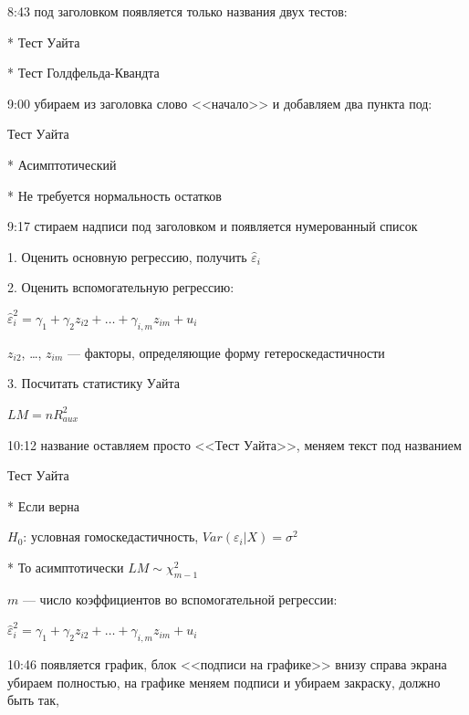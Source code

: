\documentclass[12pt,a4paper]{article}
\newcommand{\e}{\varepsilon}
\begin{document}
8:43 под заголовком появляется только названия двух тестов:

* Тест Уайта

* Тест Голдфельда-Квандта

9:00 убираем из заголовка слово <<начало>> и добавляем два пункта под:

Тест Уайта

* Асимптотический

* Не требуется нормальность остатков

9:17 стираем надписи под заголовком и появляется нумерованный список

1. Оценить основную регрессию, получить $\hat{\varepsilon}_i$

2. Оценить вспомогательную регрессию:

$\hat{\varepsilon}^2_i = \gamma_1 + \gamma_2 z_{i2} + \ldots + \gamma_{i,m} z_{im}+ u_i$

$z_{i2}$, \ldots, $z_{im}$ --- факторы, определяющие форму гетероскедастичности

3. Посчитать статистику Уайта

$LM=nR^2_{aux}$


10:12 название оставляем просто <<Тест Уайта>>, меняем текст под названием

Тест Уайта


* Если верна

$H_0$: условная гомоскедастичность, $Var(\e_i|X)=\sigma^2$

* То асимптотически $LM\sim \chi^2_{m-1}$

$m$ --- число коэффициентов во вспомогательной регрессии:

$\hat{\varepsilon}^2_i = \gamma_1 + \gamma_2 z_{i2} + \ldots + \gamma_{i,m} z_{im}+ u_i$

10:46 появляется график, блок <<подписи на графике>> внизу справа экрана убираем полностью, на графике меняем подписи и убираем закраску, должно быть так, 
\end{document}

